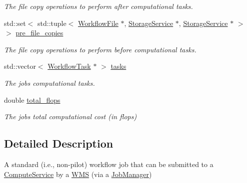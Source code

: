 \begin{DoxyCompactItemize}
\begin{DoxyCompactList}\small\item\em The file copy operations to perform after computational tasks. \end{DoxyCompactList}\item 
\mbox{\label{classwrench_1_1_standard_job_ad51c7c980f194968dbee7e99043ed795}} 
std\+::set$<$ std\+::tuple$<$ \hyperlink{classwrench_1_1_workflow_file}{Workflow\+File} $\ast$, \hyperlink{classwrench_1_1_storage_service}{Storage\+Service} $\ast$, \hyperlink{classwrench_1_1_storage_service}{Storage\+Service} $\ast$ $>$ $>$ \hyperlink{classwrench_1_1_standard_job_ad51c7c980f194968dbee7e99043ed795}{pre\+\_\+file\+\_\+copies}
\begin{DoxyCompactList}\small\item\em The file copy operations to perform before computational tasks. \end{DoxyCompactList}\item 
\mbox{\label{classwrench_1_1_standard_job_a5e5952459506f8cd52cc611ea8e4505a}} 
std\+::vector$<$ \hyperlink{classwrench_1_1_workflow_task}{Workflow\+Task} $\ast$ $>$ \hyperlink{classwrench_1_1_standard_job_a5e5952459506f8cd52cc611ea8e4505a}{tasks}
\begin{DoxyCompactList}\small\item\em The job\textquotesingle{}s computational tasks. \end{DoxyCompactList}\item 
\mbox{\label{classwrench_1_1_standard_job_a828c40483b8d94cfbedf09bddddc31be}} 
double \hyperlink{classwrench_1_1_standard_job_a828c40483b8d94cfbedf09bddddc31be}{total\+\_\+flops}
\begin{DoxyCompactList}\small\item\em The job\textquotesingle{}s total computational cost (in flops) \end{DoxyCompactList}\end{DoxyCompactItemize}


\subsection{Detailed Description}
A standard (i.\+e., non-\/pilot) workflow job that can be submitted to a \hyperlink{classwrench_1_1_compute_service}{Compute\+Service} by a \hyperlink{classwrench_1_1_w_m_s}{W\+MS} (via a \hyperlink{classwrench_1_1_job_manager}{Job\+Manager}) 

